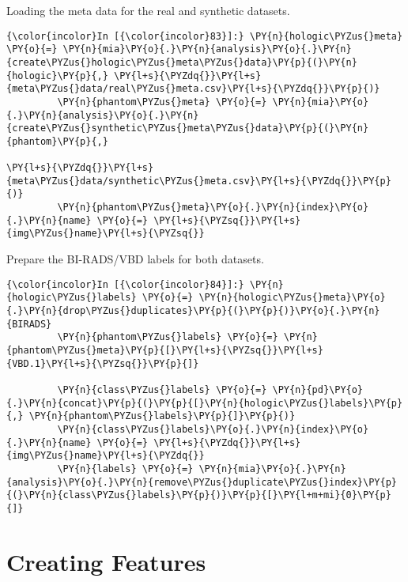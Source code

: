     Loading the meta data for the real and synthetic datasets.

    \begin{Verbatim}[commandchars=\\\{\}]
{\color{incolor}In [{\color{incolor}83}]:} \PY{n}{hologic\PYZus{}meta} \PY{o}{=} \PY{n}{mia}\PY{o}{.}\PY{n}{analysis}\PY{o}{.}\PY{n}{create\PYZus{}hologic\PYZus{}meta\PYZus{}data}\PY{p}{(}\PY{n}{hologic}\PY{p}{,} \PY{l+s}{\PYZdq{}}\PY{l+s}{meta\PYZus{}data/real\PYZus{}meta.csv}\PY{l+s}{\PYZdq{}}\PY{p}{)}
         \PY{n}{phantom\PYZus{}meta} \PY{o}{=} \PY{n}{mia}\PY{o}{.}\PY{n}{analysis}\PY{o}{.}\PY{n}{create\PYZus{}synthetic\PYZus{}meta\PYZus{}data}\PY{p}{(}\PY{n}{phantom}\PY{p}{,}
                                                                 \PY{l+s}{\PYZdq{}}\PY{l+s}{meta\PYZus{}data/synthetic\PYZus{}meta.csv}\PY{l+s}{\PYZdq{}}\PY{p}{)}
         \PY{n}{phantom\PYZus{}meta}\PY{o}{.}\PY{n}{index}\PY{o}{.}\PY{n}{name} \PY{o}{=} \PY{l+s}{\PYZsq{}}\PY{l+s}{img\PYZus{}name}\PY{l+s}{\PYZsq{}}
\end{Verbatim}

    Prepare the BI-RADS/VBD labels for both datasets.

    \begin{Verbatim}[commandchars=\\\{\}]
{\color{incolor}In [{\color{incolor}84}]:} \PY{n}{hologic\PYZus{}labels} \PY{o}{=} \PY{n}{hologic\PYZus{}meta}\PY{o}{.}\PY{n}{drop\PYZus{}duplicates}\PY{p}{(}\PY{p}{)}\PY{o}{.}\PY{n}{BIRADS}
         \PY{n}{phantom\PYZus{}labels} \PY{o}{=} \PY{n}{phantom\PYZus{}meta}\PY{p}{[}\PY{l+s}{\PYZsq{}}\PY{l+s}{VBD.1}\PY{l+s}{\PYZsq{}}\PY{p}{]}

         \PY{n}{class\PYZus{}labels} \PY{o}{=} \PY{n}{pd}\PY{o}{.}\PY{n}{concat}\PY{p}{(}\PY{p}{[}\PY{n}{hologic\PYZus{}labels}\PY{p}{,} \PY{n}{phantom\PYZus{}labels}\PY{p}{]}\PY{p}{)}
         \PY{n}{class\PYZus{}labels}\PY{o}{.}\PY{n}{index}\PY{o}{.}\PY{n}{name} \PY{o}{=} \PY{l+s}{\PYZdq{}}\PY{l+s}{img\PYZus{}name}\PY{l+s}{\PYZdq{}}
         \PY{n}{labels} \PY{o}{=} \PY{n}{mia}\PY{o}{.}\PY{n}{analysis}\PY{o}{.}\PY{n}{remove\PYZus{}duplicate\PYZus{}index}\PY{p}{(}\PY{n}{class\PYZus{}labels}\PY{p}{)}\PY{p}{[}\PY{l+m+mi}{0}\PY{p}{]}
\end{Verbatim}

    \section{Creating Features}\label{creating-features}

